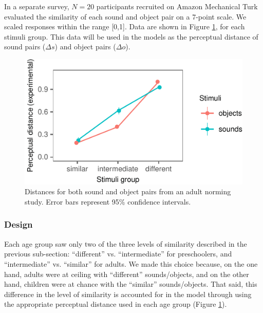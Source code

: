 \documentclass[10pt, letterpaper]{article}
\newenvironment{CodeChunk}{}{}
\begin{document}
In a separate survey, \(N=20\) participants recruited on Amazon
Mechanical Turk evaluated the similarity of each sound and object pair
on a 7-point scale. We scaled responses within the range {[}0,1{]}. Data
are shown in Figure \ref{fig:stim}, for each stimuli group. This data
will be used in the models as the perceptual distance of sound pairs
(\(\Delta s\)) and object pairs (\(\Delta o\)).

\begin{CodeChunk}
\begin{figure}[h]

{\centering \includegraphics{figs/stim-1} 

}

\caption{\label{fig:stim}Distances for both sound and object pairs from an adult norming study. Error bars represent 95\% confidence intervals.}\label{fig:stim}
\end{figure}
\end{CodeChunk}

\subsubsection{Design}\label{design}

Each age group saw only two of the three levels of similarity described
in the previous sub-section: ``different'' vs. ``intermediate'' for
preschoolers, and ``intermediate'' vs. ``similar'' for adults. We made
this choice because, on the one hand, adults were at ceiling with
``different'' sounds/objects, and on the other hand, children were at
chance with the ``similar'' sounds/objects. That said, this difference
in the level of similarity is accounted for in the model through using
the appropriate perceptual distance used in each age group (Figure
\ref{fig:stim}).
\end{document}
